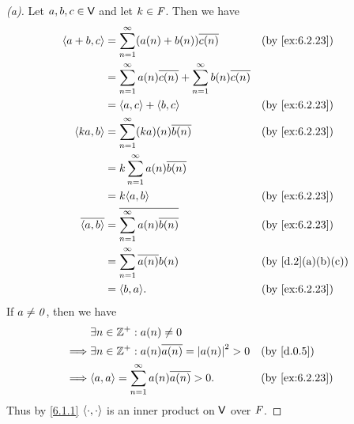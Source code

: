 \begin{proof}[(a)]
  Let \(a, b, c \in \mathsf{V}\) and let \(k \in \mathit{F}\).
  Then we have
  \begin{align*}
    \inn{a + b, c}    & = \sum_{n = 1}^\infty (a(n) + b(n)) \conj{c(n)}                               &  & \text{(by \cref{ex:6.2.23})}    \\
                      & = \sum_{n = 1}^\infty a(n) \conj{c(n)} + \sum_{n = 1}^\infty b(n) \conj{c(n)}                                      \\
                      & = \inn{a, c} + \inn{b, c}                                                     &  & \text{(by \cref{ex:6.2.23})}    \\
    \inn{ka, b}       & = \sum_{n = 1}^\infty (ka)(n) \conj{b(n)}                                     &  & \text{(by \cref{ex:6.2.23})}    \\
                      & = k \sum_{n = 1}^\infty a(n) \conj{b(n)}                                                                           \\
                      & = k \inn{a, b}                                                                &  & \text{(by \cref{ex:6.2.23})}    \\
    \conj{\inn{a, b}} & = \conj{\sum_{n = 1}^\infty a(n) \conj{b(n)}}                                 &  & \text{(by \cref{ex:6.2.23})}    \\
                      & = \sum_{n = 1}^\infty \conj{a(n)} b(n)                                        &  & \text{(by \cref{d.2}(a)(b)(c))} \\
                      & = \inn{b, a}.                                                                 &  & \text{(by \cref{ex:6.2.23})}
  \end{align*}
  If \(a \neq \mathit{0}\), then we have
  \begin{align*}
             & \exists n \in \Z^+ : a(n) \neq 0                                                           \\
    \implies & \exists n \in \Z^+ : a(n) \conj{a(n)} = \abs{a(n)}^2 > 0 &  & \text{(by \cref{d.0.5})}     \\
    \implies & \inn{a, a} = \sum_{n = 1}^\infty a(n) \conj{a(n)} > 0.   &  & \text{(by \cref{ex:6.2.23})}
  \end{align*}
  Thus by \cref{6.1.1} \(\left\langle\cdot, \cdot\right\rangle\) is an inner product on \(\mathsf{V}\) over \(\mathit{F}\).
\end{proof}

